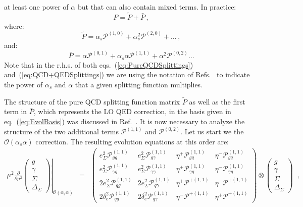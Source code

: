 \begin{widetext}
at least one power of $\alpha$ but that can also contain mixed
terms. In practice:
\begin{equation}
P = \widetilde{P} + \bar{P}\,,
\end{equation}
where:
\begin{equation}\label{eq:PureQCDSplittings}
\widetilde{P} = \alpha_s \mathcal{P}^{(1,0)} + \alpha_s^2 \mathcal{P}^{(2,0)}+\dots\,,
\end{equation}
and:
\begin{equation}\label{eq:QCD+QEDSplittings}
\bar{P} = \alpha \mathcal{P}^{(0,1)} + \alpha_s\alpha \mathcal{P}^{(1,1)}+\alpha^2 \mathcal{P}^{(0,2)}\dots
\end{equation}
Note that in the r.h.s. of both eqs.~(\ref{eq:PureQCDSplittings})
and~(\ref{eq:QCD+QEDSplittings}) we are using the notation of
Refs.~\cite{deFlorian:2015ujt,deFlorian:2016gvk} to indicate the power
of $\alpha_s$ and $\alpha$ that a given splitting function multiplies.

The structure of the pure QCD splitting function matrix
$\widetilde{P}$ as well as the first term in $\bar{P}$, which
represents the LO QED correction, in the basis given in
eq.~(\ref{eq:EvolBasis}) was discussed in
Ref.~\cite{Bertone:2015lqa}. It is now necessary to analyze the
structure of the two additional terms $\mathcal{P}^{(1,1)}$ and
$\mathcal{P}^{(0,2)}$. Let us start we the
$\mathcal{O}(\alpha_s\alpha)$ correction. The resulting evolution
equations at this order are:
\begin{equation}
\begin{array}{rcl}
\displaystyle\left.\mu^2\frac{\partial}{\partial \mu^2}
\begin{pmatrix}
g\\
\gamma\\
\Sigma\\
\Delta_\Sigma
\end{pmatrix}
\right|_{\mathcal{O}(\alpha_s \alpha)} &=& \displaystyle \begin{pmatrix}
e_\Sigma^2 \mathcal{P}^{(1,1)}_{gg}      & e_\Sigma^2 \mathcal{P}^{(1,1)}_{g\gamma} & \eta^+\mathcal{P}^{(1,1)}_{gq} & \eta^-\mathcal{P}^{(1,1)}_{gq} \\
e_\Sigma^2 \mathcal{P}^{(1,1)}_{\gamma g} & e_\Sigma^2 \mathcal{P}^{(1,1)}_{\gamma\gamma} & \eta^+\mathcal{P}^{(1,1)}_{\gamma q} &\eta^-\mathcal{P}^{(1,1)}_{\gamma q} \\
2 e_\Sigma^2 \mathcal{P}^{(1,1)}_{qg}    & 2 e_\Sigma^2 \mathcal{P}^{(1,1)}_{q\gamma} & \eta^+\mathcal{P}^{+(1,1)}  & \eta^-\mathcal{P}^{+(1,1)}\\
2 \delta_e^2 \mathcal{P}^{(1,1)}_{qg} & 2 \delta_e^2 \mathcal{P}^{(1,1)}_{q\gamma} &\eta^-\mathcal{P}^{+(1,1)} &\eta^+\mathcal{P}^{+(1,1)}
\end{pmatrix}\otimes
\begin{pmatrix}
g\\
\gamma\\
\Sigma\\
\Delta_\Sigma
\end{pmatrix}
\end{array}\,,
\end{equation}


\end{widetext}
